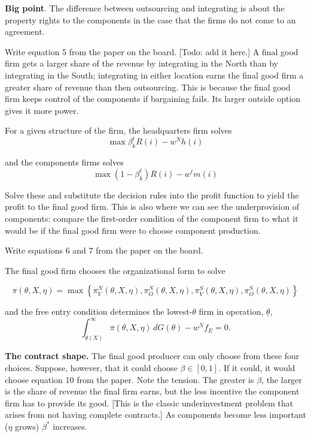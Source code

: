 \documentclass[11pt, pdftex]{article}
\begin{document}
\textbf{Big point}. The difference between outsourcing and integrating is about the property rights to the components in the case that the firms do not come to an agreement.

Write equation 5 from the paper on the board. [Todo: add it here.] A final good firm gets a larger share of the revenue by integrating in the North than by integrating in the South; integrating in either location earns the final good firm a greater share of revenue than then outsourcing. This is because the final good firm keeps control of the components if bargaining fails. Its larger outside option gives it more power.

For a given structure of the firm, the headquarters firm solves
\begin{equation}\label{eq:hmax}
    \max \beta_k^\ell R(i) - w^Nh(i)
\end{equation}

and the components firms solves
\begin{equation}\label{eq:hmax}
    \max (1-\beta_k^\ell) R(i) - w^\ell m(i)
\end{equation}

Solve these and substitute the decision rules into the profit function to yield the profit to the final good firm. This is also where we can see the underprovision of components: compare the first-order condition of the component firm to what it would be if the final good firm were to choose component production.

Write equations 6 and 7 from the paper on the board.

The final good firm chooses the organizational form to solve

\begin{equation}\label{eq:maxpi}
    \pi(\theta, X, \eta) = \max \left \{ \pi_V^N (\theta, X, \eta), \pi_O^N (\theta, X, \eta), \pi_V^S (\theta, X, \eta), \pi_O^S (\theta, X, \eta) \right \}
\end{equation}

and the free entry condition determines the lowest-$\theta$ firm in operation, $\underline{\theta}$,
\begin{equation}\label{eq:free}
    \int_{\underline{\theta}(X)}^\infty \pi(\theta,X,\eta) \, dG(\theta) - w^Nf_E=0.
\end{equation}

\textbf{The contract shape.}  The final good producer can only choose  from these four choices. Suppose, however, that it could choose $\beta  \in [0,1]$. If it could, it would choose equation 10 from the paper. Note the tension. The greater is $\beta$, the larger is the share of revenue the final firm earns, but the less incentive the component firm has to provide its good. [This is the classic underinvestment problem that arises from not having complete contracts.] As components become less important ($\eta$ grows) $\beta^*$ increases.
\end{document}
